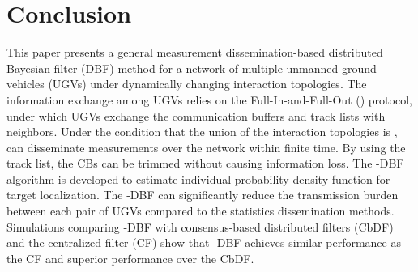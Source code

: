 \section{Conclusion}\label{sec:conclu}	
	This paper presents a general measurement dissemination-based distributed Bayesian filter (DBF) method for a network of multiple unmanned ground vehicles (UGVs) under dynamically changing interaction topologies.
	The information exchange among UGVs relies on the Full-In-and-Full-Out (\proto) protocol, under which UGVs exchange the communication buffers and track lists with neighbors.
	Under the condition that the union of the interaction topologies is \fc, {\proto} can disseminate measurements over the network within finite time. 
	By using the track list, the CBs can be trimmed without causing information loss.
	The \proto-DBF algorithm is developed to estimate individual probability density function for target localization. 	
	The \proto-DBF can significantly reduce the transmission burden between each pair of UGVs compared to the statistics dissemination methods.
	Simulations comparing \proto-DBF with consensus-based distributed filters (CbDF) and the centralized filter (CF) show that \proto-DBF achieves similar performance as the CF and superior performance over the CbDF.
	
